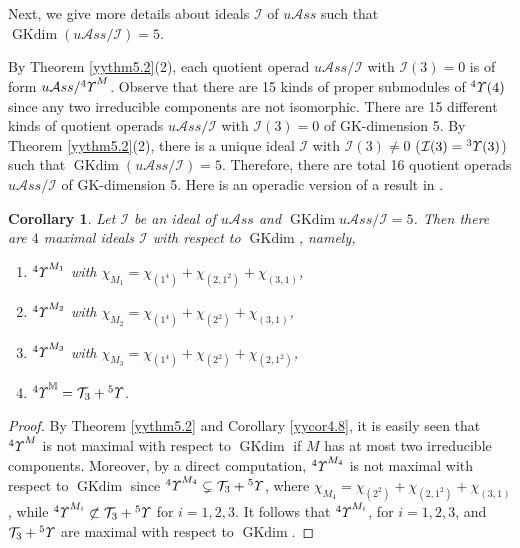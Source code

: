 \documentclass{amsart}
\newtheorem{cor}[thm]{Corollary}
\theoremstyle{definition}
\theoremstyle{remark}
\numberwithin{equation}{section}
\newcommand{\up}[1]{{^{#1}{\it \!\Upsilon}}}
\newcommand{\upa}[1]{{^{#1}{\it \!\Upsilon}}}
\def \uas{u\mathcal{A}ss}
\def \I{\mathcal{I}}
\def\gkdim{\operatorname{GKdim}}
\def\T{\mathcal{T}}
\begin{document}
Next, we give more details about ideals $\I$ of 
$\uas$ such that $\gkdim(\uas/\I)=5$.


By Theorem \ref{yythm5.2}(2), each quotient operad 
$\uas/\I$ with $\I(3)=0$ 
is of form ${\uas}/{\up{4}^M}$. Observe that there are 15 
kinds of proper submodules of $\up{4}(4)$ since any two 
irreducible components are not isomorphic. There are 15 different
kinds of quotient operads $\uas/\I$ with $\I(3)=0$ of GK-dimension 5. 
By Theorem \ref{yythm5.2}(2), there is a unique ideal 
$\I$ with $\I(3)\neq 0$ 
($\I(3)=\up{3}(3)$) such that $\gkdim(\uas/\I)=5$. Therefore, 
there are total 16 quotient operads $\uas/\I$ of GK-dimension 5.
Here is an operadic version of a result in \cite{GMZ}.

\begin{cor}
\label{yycor5.4}
Let $\I$ be an ideal of $\uas$ and $\gkdim\uas/\I=5$.
Then there are $4$ maximal ideals $\I$ with respect to 
$\gkdim$, namely,  
\begin{enumerate}
\item[(1)] 
$\up{4}^{M_1}$ with 
$\chi_{M_1}=\chi_{(1^4)}+\chi_{(2, 1^2)}+\chi_{(3, 1)}$,
\item[(2)] 
$\up{4}^{M_2}$ with 
$\chi_{M_2}=\chi_{(1^4)}+\chi_{(2^2)}+\chi_{(3, 1)}$,
\item[(3)] 
$\up{4}^{M_3}$ with 
$\chi_{M_3}=\chi_{(1^4)}+\chi_{(2^2)}+\chi_{(2, 1^2)}$,
\item[(4)] 
$\upa{4}^{\mathbb M}=\T_3+\up{5}$.
\end{enumerate}
\end{cor}

\begin{proof} 
By Theorem \ref{yythm5.2} and Corollary \ref{yycor4.8}, 
it is easily seen that $\up{4}^M$ is not maximal with 
respect to $\gkdim$ if $M$ has at most two 
irreducible components. Moreover, by a direct computation,
$\up{4}^{M_4}$ is not maximal with respect to 
$\gkdim$ since $\up{4}^{M_4} \subsetneq \T_3+\up{5}$, 
where $\chi_{M_4}=\chi_{(2^2)}+\chi_{(2, 1^2)}+\chi_{(3, 1)}$, 
while $\up{4}^{M_i}\not\subset \T_3+\up{5}$ for $i=1, 2, 3$. 
It follows that $\up{4}^{M_i}$, for $i=1, 2, 3$, and 
$\T_3+\up{5}$ are maximal with respect to $\gkdim$.
\end{proof}
\end{document}
